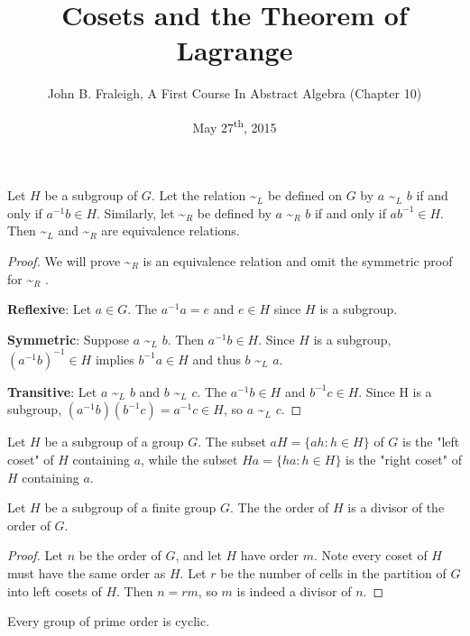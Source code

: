 \documentclass[a4paper,11pt]{article}
\title{Cosets and the Theorem of Lagrange}
\author{John B. Fraleigh, A First Course In Abstract Algebra (Chapter 10)}
\date{May 27\textsuperscript{th}, 2015}
\newcommand{\lowtilde}[1] {
  \textasciitilde{}\(_{#1}\)
}
\begin{document}
\maketitle
{}

\begin{outline}

    Let \(H\) be a subgroup of \(G\). Let the relation\lowtilde{L}be defined on \(G\) 
    by \(a\)\lowtilde{L}\(b\) if and only if \(a^{-1}b \in H\). Similarly, let\lowtilde{R}be defined 
    by \(a\)\lowtilde{R}\(b\) if and only if \(ab^{-1} \in H\). Then\lowtilde{L}and\lowtilde{R}are 
    equivalence relations.
    
    \begin{proof}
      We will prove\lowtilde{R}is an equivalence relation and omit the symmetric proof for\lowtilde{R}.
      
      \textbf{Reflexive}: Let \(a \in G\). The \(a^{-1}a = e\) and \(e \in H\) since \(H\) is a subgroup.
      
      \textbf{Symmetric}: Suppose \(a\)\lowtilde{L}\(b\). Then \(a^{-1}b \in H\). Since \(H\) is a subgroup,
      \((a^{-1}b)^{-1} \in H\) implies \(b^{-1}a \in H\) and thus \(b\)\lowtilde{L}\(a\).
      
      \textbf{Transitive}: Let \(a\)\lowtilde{L}\(b\) and \(b\)\lowtilde{L}\(c\). The \(a^{-1}b \in H\) 
      and \(b^{-1}c \in H\). Since H is a subgroup, \((a^{-1}b)(b^{-1}c) = a^{-1}c \in H\), so 
      \(a\)\lowtilde{L}\(c\).
    \end{proof}
    
    Let \(H\) be a subgroup of a group \(G\). The subset \(aH = \{ah : h \in H\}\) of \(G\)
    is the "left coset" of \(H\) containing \(a\), while the subset \(Ha = \{ha : h \in H\}\) is the "right
    coset" of \(H\) containing \(a\).
    
    Let \(H\) be a subgroup of a finite group \(G\). The the order of \(H\) is a divisor of the order of \(G\).
    
    \begin{proof}
      Let \(n\) be the order of \(G\), and let \(H\) have order \(m\). Note every coset of \(H\) must have
      the same order as \(H\). Let \(r\) be the number of cells in the partition of \(G\) into left cosets of
      \(H\). Then \(n = rm\), so \(m\) is indeed a divisor of \(n\).
    \end{proof}
    
    Every group of prime order is cyclic.
    

\end{outline}
\end{document}
